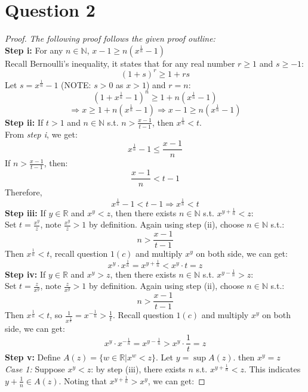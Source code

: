 \documentclass{article}
\begin{document}
\section*{Question 2}
\begin{proof}
    \textit{The following proof follows the given proof outline:}
    \\
    \textbf{Step i:} For any $n \in \mathbb{N}$, $x - 1 \geq n(x^{\frac{1}{n}} - 1)$
    \\
    Recall Bernoulli's inequality, it states that for any real number $r \geq 1$ and $s \geq -1$:
    \[ (1 + s)^r \geq 1 + rs \]
    Let $s = x^{\frac{1}{n}} - 1$ (NOTE: $s > 0$ as $x > 1$) and $r = n$:
    \[ (1 + x^{\frac{1}{n}} - 1)^n \geq 1 + n(x^{\frac{1}{n}} - 1) \]
    \[ \Rightarrow x \geq 1 + n(x^{\frac{1}{n}} - 1) \Rightarrow x - 1 \geq n(x^{\frac{1}{n}} - 1) \]
    \textbf{Step ii:} If $t > 1$ and $n \in \mathbb{N}$ s.t. $n > \frac{x - 1}{t - 1}$, then $x^\frac{1}{n} < t$.
    \\
    From \textit{step i}, we get:
    \[ x^{\frac{1}{n}} - 1 \leq \frac{x - 1}{n} \]
    If $n > \frac{x - 1}{t - 1}$, then:
    \[ \frac{x - 1}{n} < t - 1 \]
    Therefore,
    \[ x^{\frac{1}{n}} - 1 < t - 1 \Longrightarrow x^{\frac{1}{n}} < t \]
    \textbf{Step iii:} If $y \in \mathbb{R}$ and $x^y < z$, then there exists $n \in \mathbb{N}$ s.t. $x^{y + \frac{1}{n}} < z$:
    \\
    Set $t = \frac{x^y}{z}$, note $\frac{x^y}{z} > 1$ by definition. Again using step (ii), choose $n \in \mathbb{N}$ s.t.:
    \[ n > \frac{x - 1}{t - 1} \]
    Then $x^{\frac{1}{n}} < t$, recall question $1(c)$ and multiply $x^y$ on both side, we can get:
    \[ x^y \cdot x^{\frac{1}{n}} = x^{y + \frac{1}{n}}  < x^y \cdot t = z \]
    \textbf{Step iv:} If $y \in \mathbb{R}$ and $x^y > z$, then there exists $n \in \mathbb{N}$ s.t. $x^{y - \frac{1}{n}} > z$:
    \\
    Set $t = \frac{z}{x^y}$, note $\frac{z}{x^y} > 1$ by definition. Again using step (ii), choose $n \in \mathbb{N}$ s.t.:
    \[ n > \frac{x - 1}{t - 1} \]
    Then $x^{\frac{1}{n}} < t$, so $ \frac{1}{x^{\frac{1}{n}}} = x^{-\frac{1}{n}} > \frac{1}{t}$. Recall question $1(c)$ and multiply $x^y$ on both side, we can get:
    \[ x^y \cdot x^{-\frac{1}{n}} = x^{y - \frac{1}{n}} > x^y \cdot \frac{1}{t} = z \]
    \textbf{Step v:} Define $A(z) = \{w \in \mathbb{R} | x^w < z \}$. Let $y = \sup A(z)$. then $x^y = z$
    \\
    \textit{Case 1: }
    Suppose $x^y < z$: by step (iii), there exists $n$ s.t. $x^{y + \frac{1}{n}} < z$. This indicates $y + \frac{1}{n} \in A(z)$. Noting that $x^{y + \frac{1}{n}} > x^{y}$, we can get:

\end{proof}
\end{document}

